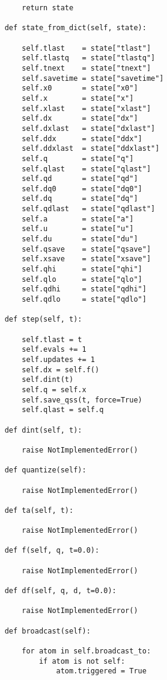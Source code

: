 \begin{lstlisting}
        return state

    def state_from_dict(self, state):

        self.tlast    = state["tlast"]      
        self.tlastq   = state["tlastq"]     
        self.tnext    = state["tnext"]      
        self.savetime = state["savetime"]   
        self.x0       = state["x0"]         
        self.x        = state["x"]          
        self.xlast    = state["xlast"]      
        self.dx       = state["dx"]         
        self.dxlast   = state["dxlast"]     
        self.ddx      = state["ddx"]        
        self.ddxlast  = state["ddxlast"]    
        self.q        = state["q"]          
        self.qlast    = state["qlast"]      
        self.qd       = state["qd"]         
        self.dq0      = state["dq0"]        
        self.dq       = state["dq"]         
        self.qdlast   = state["qdlast"]     
        self.a        = state["a"]          
        self.u        = state["u"]          
        self.du       = state["du"]         
        self.qsave    = state["qsave"]      
        self.xsave    = state["xsave"]      
        self.qhi      = state["qhi"]        
        self.qlo      = state["qlo"]        
        self.qdhi     = state["qdhi"]       
        self.qdlo     = state["qdlo"]       

    def step(self, t):

        self.tlast = t
        self.evals += 1
        self.updates += 1
        self.dx = self.f()
        self.dint(t)
        self.q = self.x
        self.save_qss(t, force=True)
        self.qlast = self.q

    def dint(self, t):

        raise NotImplementedError()

    def quantize(self):

        raise NotImplementedError()

    def ta(self, t):

        raise NotImplementedError()

    def f(self, q, t=0.0):

        raise NotImplementedError()

    def df(self, q, d, t=0.0):

        raise NotImplementedError()

    def broadcast(self):

        for atom in self.broadcast_to:
            if atom is not self:
                atom.triggered = True


\end{lstlisting}
